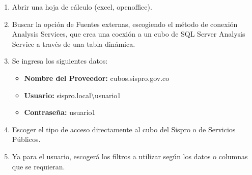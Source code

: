\documentclass[a4paper,openright,12pt]{book}
\theoremstyle{definition}
\theoremstyle{remark}
\begin{document}
\begin{enumerate}
    \begin{enumerate}
		\item Abrir una hoja de cálculo (excel, openoffice).
        \item Buscar la opción de Fuentes externas, escogiendo el método de conexión Analysis Services, que crea una coexión a un cubo de SQL Server Analysis Service a través de una tabla dinámica.
        \item Se ingresa los siguientes datos:
            \begin{itemize}
				\item \textbf{Nombre del Proveedor:} cubos.sispro.gov.co
       			 \item \textbf{Usuario:} sispro.local\textbackslash usuario1
				\item \textbf{Contraseña:} usuario1
	\end{itemize}
    	\item Escoger el tipo de acceso directamente al cubo del Sispro o de Servicios Públicos.
        \item Ya para el usuario, escogerá los filtros a utilizar según los datos o columnas que se requieran.
	\end{enumerate}
    

\end{enumerate}
\end{document}
